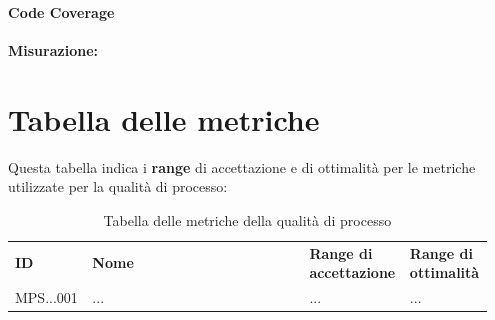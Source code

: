 \documentclass[PianoDiQualifica.tex]{subfiles}
\begin{document}
\paragraph{Code Coverage}

\textbf{Misurazione:}



\section{Tabella delle metriche}
Questa tabella indica i \textbf{range} di accettazione e di ottimalità per le metriche utilizzate per la qualità di processo:
\begin{table}[H]
	\begin{center}
		\begin{tabu} to 
			\tableHeaderStyle
			\textbf{ID} & \textbf{Nome} & \textbf{Range di accettazione} & \textbf{Range di ottimalità}\\

			MPS...001 & ... & ... & ... \\ 

		\end{tabu}
		\caption{Tabella delle metriche della qualità di processo}
		\vspace{-1em}
	\end{center}
\end{table}
\end{document}
